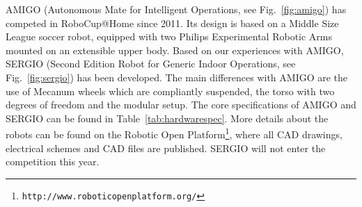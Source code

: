 AMIGO (Autonomous Mate for Intelligent Operations, see Fig.~\ref{fig:amigo}) has competed in RoboCup@Home since 2011. Its design is based on a Middle Size League soccer robot, equipped with two Philips\texttrademark \hspace{0em} Experimental Robotic Arms mounted on an extensible upper body. Based on our experiences with AMIGO, SERGIO (Second Edition Robot for Generic Indoor Operations, see Fig.~\ref{fig:sergio}) has been developed. The main differences with AMIGO are the use of Mecanum wheels which are compliantly suspended, the torso with two degrees of freedom and the modular setup. The core specifications of AMIGO and SERGIO can be found in Table~\ref{tab:hardwarespec}. More details about the robots can be found on the Robotic Open Platform\footnote{\texttt{http://www.roboticopenplatform.org/}}, where all CAD drawings, electrical schemes and CAD files are published. SERGIO will not enter the competition this year.

